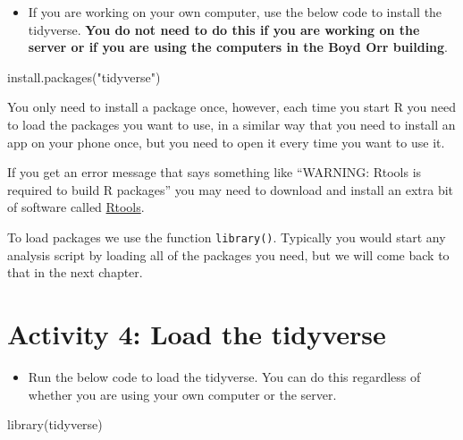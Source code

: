 \documentclass[
  oneside]{book}
\newenvironment{Shaded}{\begin{snugshade}}{\end{snugshade}}
\newcommand{\FunctionTok}[1]{\textcolor[rgb]{0.00,0.00,0.00}{#1}}
\newcommand{\NormalTok}[1]{#1}
\newcommand{\StringTok}[1]{\textcolor[rgb]{0.31,0.60,0.02}{#1}}
\providecommand{\tightlist}{%
  \setlength{\itemsep}{0pt}\setlength{\parskip}{0pt}}
\begin{document}
\begin{itemize}
\tightlist
\item
  If you are working on your own computer, use the below code to install the tidyverse. \textbf{You do not need to do this if you are working on the server or if you are using the computers in the Boyd Orr building}.
\end{itemize}

\begin{Shaded}
\begin{Highlighting}[]
\FunctionTok{install.packages}\NormalTok{(}\StringTok{"tidyverse"}\NormalTok{)}
\end{Highlighting}
\end{Shaded}

You only need to install a package once, however, each time you start R you need to load the packages you want to use, in a similar way that you need to install an app on your phone once, but you need to open it every time you want to use it.

\begin{danger}
If you get an error message that says something like ``WARNING: Rtools
is required to build R packages'' you may need to download and install
an extra bit of software called
\href{https://cran.r-project.org/bin/windows/Rtools/}{Rtools}.
\end{danger}

To load packages we use the function \texttt{library()}. Typically you would start any analysis script by loading all of the packages you need, but we will come back to that in the next chapter.

\hypertarget{activity-4-load-the-tidyverse}{%
\section{Activity 4: Load the tidyverse}\label{activity-4-load-the-tidyverse}}

\begin{itemize}
\tightlist
\item
  Run the below code to load the tidyverse. You can do this regardless of whether you are using your own computer or the server.
\end{itemize}

\begin{Shaded}
\begin{Highlighting}[]
\FunctionTok{library}\NormalTok{(tidyverse)}
\end{Highlighting}
\end{Shaded}
\end{document}
